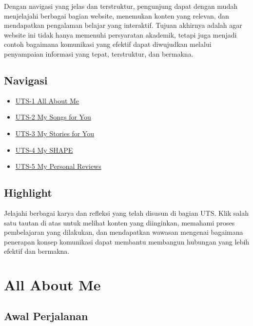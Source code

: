 \documentclass[
  letterpaper,
  DIV=11,
  numbers=noendperiod]{scrreprt}
\providecommand{\tightlist}{%
  \setlength{\itemsep}{0pt}\setlength{\parskip}{0pt}}
\begin{document}
Dengan navigasi yang jelas dan terstruktur, pengunjung dapat dengan
mudah menjelajahi berbagai bagian website, menemukan konten yang
relevan, dan mendapatkan pengalaman belajar yang interaktif. Tujuan
akhirnya adalah agar website ini tidak hanya memenuhi persyaratan
akademik, tetapi juga menjadi contoh bagaimana komunikasi yang efektif
dapat diwujudkan melalui penyampaian informasi yang tepat, terstruktur,
dan bermakna.

\section*{Navigasi}\label{navigasi}


\begin{itemize}
\tightlist
\item
  \href{All_About_me/index.qmd}{UTS-1 All About Me}
\item
  \href{My_Song_for_You/index.qmd}{UTS-2 My Songs for You}
\item
  \href{My_Stories_for_You/index.qmd}{UTS-3 My Stories for You}
\item
  \href{My_Shapes/index.qmd}{UTS-4 My SHAPE}
\item
  \href{My_Personal_Reviews/index.qmd}{UTS-5 My Personal Reviews}
\end{itemize}

\section*{Highlight}\label{highlight}


Jelajahi berbagai karya dan refleksi yang telah disusun di bagian UTS.
Klik salah satu tautan di atas untuk melihat konten yang diinginkan,
memahami proses pembelajaran yang dilakukan, dan mendapatkan wawasan
mengenai bagaimana penerapan konsep komunikasi dapat membantu membangun
hubungan yang lebih efektif dan bermakna.


\chapter{All About Me}\label{all-about-me}

\section{Awal Perjalanan}\label{awal-perjalanan}
\end{document}
